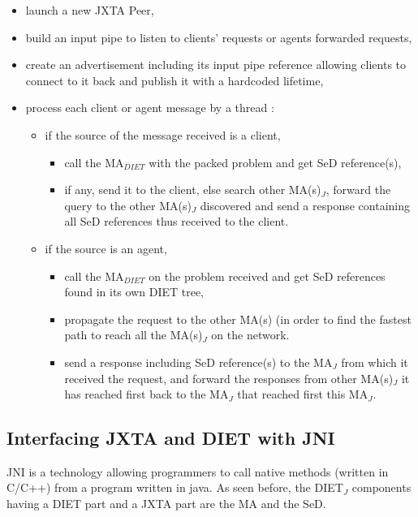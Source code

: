 \begin{itemize}
\item{launch a new JXTA Peer,}
\item{build an input pipe to listen to clients' requests or agents
    forwarded requests,}
\item{create an advertisement including its input pipe reference
    allowing clients to connect to it back and publish it with a
    hardcoded lifetime,}
\item{process each client or agent message by a thread :
\begin{itemize}
\item{if the source of the message received is a client,}
  \begin{itemize}
  \item{call the MA$_{DIET}$ with the packed problem and get SeD
      reference(s),}
  \item{if any, send it to the client, else search other MA(s)$_{J}$,
      forward the query to the other MA(s)$_{J}$ discovered and
      send a response containing all SeD references thus received to
      the client.}
  \end{itemize}
\item{if the source is an agent,}
          \begin{itemize}
          \item{call the MA$_{DIET}$ on the problem received and get
              SeD references found in its own DIET tree, }
          \item{propagate the request to the other MA(s) (in order to
              find the fastest path to reach all the MA(s)$_{J}$ on
              the network.}
          \item{send a response including SeD reference(s) to the
              MA$_{J}$ from which it received the request, and forward
              the responses from other MA(s)$_{J}$ it has reached
              first back to the MA$_{J}$ that reached first this
              MA$_{J}$.}
          \end{itemize}
\end{itemize}}
\end{itemize}

\subsection{Interfacing JXTA and DIET with JNI}
\label{ssec:jni}

JNI is a technology allowing programmers to call native methods
(written in C/C++) from a program written in java. As seen before, the
DIET$_{J}$ components having a DIET part and a JXTA part are the MA
and the SeD.

